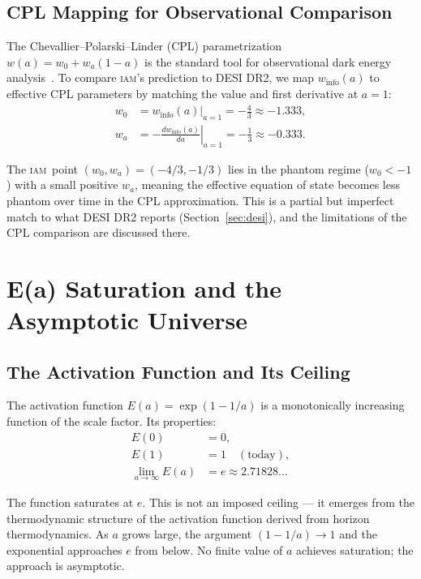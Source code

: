 \documentclass[12pt,letterpaper]{article}
\newcommand{\IAM}{\textsc{iam}}
\newcommand{\Ea}{E(a)}
\newcommand{\winfo}{w_{\mathrm{info}}(a)}
\begin{document}
\subsection{CPL Mapping for Observational Comparison}

The Chevallier--Polarski--Linder (CPL) parametrization $w(a) = w_0 + w_a(1 - a)$ is the standard tool for observational dark energy analysis~\citep{CPL2001, Linder2003}. To compare \IAM's prediction to DESI DR2, we map $\winfo$ to effective CPL parameters by matching the value and first derivative at $a = 1$:
\begin{align}
    w_0 &= \winfo\big|_{a=1} = -\tfrac{4}{3} \approx -1.333, \label{eq:w0} \\
    w_a &= -\left.\frac{d\winfo}{da}\right|_{a=1} = -\frac{1}{3} \approx -0.333. \label{eq:wa}
\end{align}

The \IAM\ point $(w_0, w_a) = (-4/3, -1/3)$ lies in the phantom regime ($w_0 < -1$) with a small positive $w_a$, meaning the effective equation of state becomes less phantom over time in the CPL approximation. This is a partial but imperfect match to what DESI DR2 reports (Section~\ref{sec:desi}), and the limitations of the CPL comparison are discussed there.

\section{E(a) Saturation and the Asymptotic Universe}
\label{sec:saturation}

\subsection{The Activation Function and Its Ceiling}

The activation function $\Ea = \exp(1 - 1/a)$ is a monotonically increasing function of the scale factor. Its properties:
\begin{align}
    E(0) &= 0, \label{eq:Ea0} \\
    E(1) &= 1 \quad (\text{today}), \label{eq:Ea1} \\
    \lim_{a \to \infty} \Ea &= e \approx 2.71828\ldots \label{eq:Ealim}
\end{align}

The function saturates at $e$. This is not an imposed ceiling --- it emerges from the thermodynamic structure of the activation function derived from horizon thermodynamics. As $a$ grows large, the argument $(1 - 1/a) \to 1$ and the exponential approaches $e$ from below. No finite value of $a$ achieves saturation; the approach is asymptotic.
\end{document}
